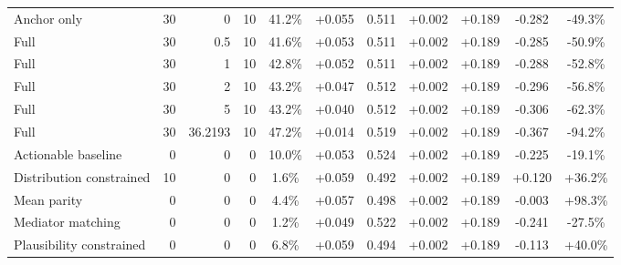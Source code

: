 \begin{table}[htbp]
\begin{tabular}{lrrrccccccc}
Anchor only & 30 & 0 & 10 & 41.2\% & +0.055 & 0.511 & +0.002 & +0.189 & -0.282 & -49.3\% \\
Full & 30 & 0.5 & 10 & 41.6\% & +0.053 & 0.511 & +0.002 & +0.189 & -0.285 & -50.9\% \\
Full & 30 & 1 & 10 & 42.8\% & +0.052 & 0.511 & +0.002 & +0.189 & -0.288 & -52.8\% \\
Full & 30 & 2 & 10 & 43.2\% & +0.047 & 0.512 & +0.002 & +0.189 & -0.296 & -56.8\% \\
Full & 30 & 5 & 10 & 43.2\% & +0.040 & 0.512 & +0.002 & +0.189 & -0.306 & -62.3\% \\
Full & 30 & 36.2193 & 10 & 47.2\% & +0.014 & 0.519 & +0.002 & +0.189 & -0.367 & -94.2\% \\
Actionable baseline & 0 & 0 & 0 & 10.0\% & +0.053 & 0.524 & +0.002 & +0.189 & -0.225 & -19.1\% \\
Distribution constrained & 10 & 0 & 0 & 1.6\% & +0.059 & 0.492 & +0.002 & +0.189 & +0.120 & +36.2\% \\
Mean parity & 0 & 0 & 0 & 4.4\% & +0.057 & 0.498 & +0.002 & +0.189 & -0.003 & +98.3\% \\
Mediator matching & 0 & 0 & 0 & 1.2\% & +0.049 & 0.522 & +0.002 & +0.189 & -0.241 & -27.5\% \\
Plausibility constrained & 0 & 0 & 0 & 6.8\% & +0.059 & 0.494 & +0.002 & +0.189 & -0.113 & +40.0\% \\
\bottomrule
\end{tabular}
\end{table}